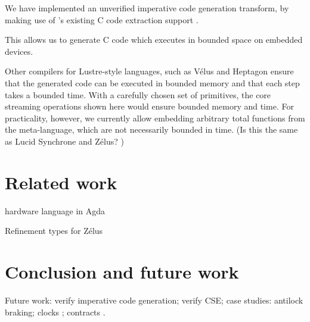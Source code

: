 \documentclass[sigplan,screen]{acmart}
\begin{document}
We have implemented an unverified imperative code generation transform, by making use of \fstar{}'s existing C code extraction support \cite{protzenko2017verified}.

This allows us to generate C code which executes in bounded space on embedded devices.

Other compilers for Lustre-style languages, such as Vélus \cite{bourke2017formally} and Heptagon \cite{gerard2012modular} ensure that the generated code can be executed in bounded memory and that each step takes a bounded time.
With a carefully chosen set of primitives, the core streaming operations shown here would ensure bounded memory and time.
For practicality, however, we currently allow embedding arbitrary total functions from the \fstar{} meta-language, which are not necessarily bounded in time.
(Is this the same as Lucid Synchrone and Zélus? \CITE)

\section{Related work}

hardware language in Agda \cite{harrison2021mechanized}

Refinement types for Zélus \cite{chen2022synchronous}

\section{Conclusion and future work}

Future work: verify imperative code generation; verify CSE; case studies: antilock braking; clocks \cite{caspi1995functional}; contracts \cite{champion2016kind2}.

\pagebreak





\end{document}
